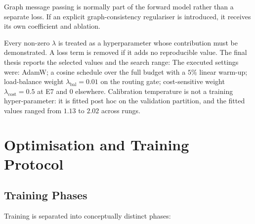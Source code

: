 Graph message passing is normally part of the forward model rather than a
separate loss. If an explicit graph-consistency regulariser is introduced, it
receives its own coefficient and ablation.

Every non-zero $\lambda$ is treated as a hyperparameter whose contribution must
be demonstrated. A loss term is removed if it adds no reproducible value. The
final thesis reports the selected values and the search range:
The executed settings were: AdamW; a cosine schedule over the full budget with
a $5\%$ linear warm-up; load-balance weight $\lambda_{\mathrm{bal}} = 0.01$ on
the routing gate; cost-sensitive weight $\lambda_{\mathrm{cost}} = 0.5$ at E7 and
$0$ elsewhere. Calibration temperature is not a training hyper-parameter: it is
fitted post hoc on the validation partition, and the fitted values ranged from
$1.13$ to $2.02$ across rungs.

\section{Optimisation and Training Protocol}
\label{sec:method-training}

\subsection{Training Phases}
\label{sec:method-training-phases}

Training is separated into conceptually distinct phases:

